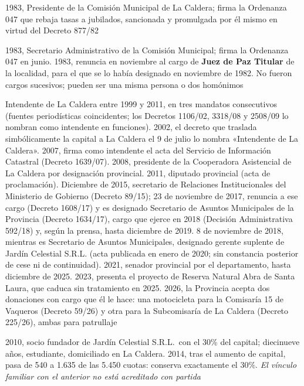 \begin{personas}
\item[{\textbf{Arturo R.\ Fernández\index{Fernández, Arturo R.}}}] 1983, Presidente de la Comisión Municipal de La Caldera; firma la Ordenanza 047 que rebaja tasas a jubilados, sancionada y promulgada por él mismo en virtud del Decreto 877/82

\item[{\textbf{Esteban Mogro\index{Mogro, Esteban}}}] 1983, Secretario Administrativo de la Comisión Municipal; firma la Ordenanza 047 en junio. 1983, renuncia en noviembre al cargo de \textbf{Juez de Paz Titular} de la localidad, para el que se lo había designado en noviembre de 1982. No fueron cargos sucesivos; pueden ser una misma persona o dos homónimos

\item[{\textbf{Héctor Miguel Calabró\index{Calabró, Héctor Miguel}}}] Intendente de La Caldera entre 1999 y 2011, en tres mandatos consecutivos (fuentes periodísticas coincidentes; los Decretos 1106/02, 3318/08 y 2508/09 lo nombran como intendente en funciones). 2002, el decreto que traslada simbólicamente la capital a La Caldera el 9 de julio lo nombra «Intendente de La Caldera». 2007, firma como intendente el acta del Servicio de Información Catastral (Decreto 1639/07). 2008, presidente de la Cooperadora Asistencial de La Caldera por designación provincial. 2011, diputado provincial (acta de proclamación). Diciembre de 2015, secretario de Relaciones Institucionales del Ministerio de Gobierno (Decreto 89/15); 23 de noviembre de 2017, renuncia a ese cargo (Decreto 1608/17) y es designado Secretario de Asuntos Municipales de la Provincia (Decreto 1634/17), cargo que ejerce en 2018 (Decisión Administrativa 592/18) y, según la prensa, hasta diciembre de 2019. 8 de noviembre de 2018, mientras es Secretario de Asuntos Municipales, designado gerente suplente de Jardín Celestial S.R.L. (acta publicada en enero de 2020; sin constancia posterior de cese ni de continuidad). 2021, senador provincial por el departamento, hasta diciembre de 2025. 2023, presenta el proyecto de Reserva Natural Abra de Santa Laura, que caduca sin tratamiento en 2025. 2026, la Provincia acepta dos donaciones con cargo que él le hace: una motocicleta para la Comisaría 15 de Vaqueros (Decreto 59/26) y otra para la Subcomisaría de La Caldera (Decreto 225/26), ambas para patrullaje

\item[{\textbf{Carlos Miguel Calabró\index{Calabró, Carlos Miguel}}}] 2010, socio fundador de Jardín Celestial S.R.L.\ con el 30\% del capital; diecinueve años, estudiante, domiciliado en La Caldera. 2014, tras el aumento de capital, pasa de 540 a 1.635 de las 5.450 cuotas: conserva exactamente el 30\%. \textit{El vínculo familiar con el anterior no está acreditado con partida}


\end{personas}
